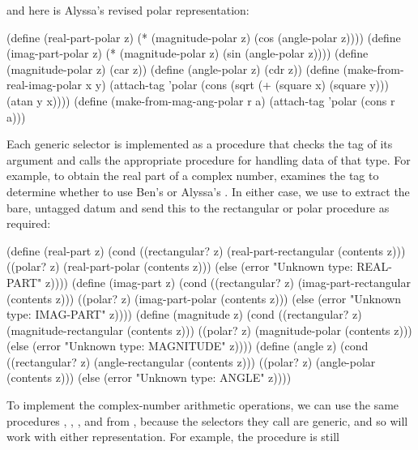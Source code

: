 \noindent
and here is Alyssa's revised polar representation:

\begin{codeBlock}
(define (real-part-polar z)
  (* (magnitude-polar z) (cos (angle-polar z))))
(define (imag-part-polar z)
  (* (magnitude-polar z) (sin (angle-polar z))))
(define (magnitude-polar z) (car z))
(define (angle-polar z) (cdr z))
(define (make-from-real-imag-polar x y)
  (attach-tag 'polar
              (cons (sqrt (+ (square x) (square y)))
                    (atan y x))))
(define (make-from-mag-ang-polar r a)
  (attach-tag 'polar (cons r a)))
\end{codeBlock}

\noindent
Each generic selector is implemented as a procedure that checks the tag of its
argument and calls the appropriate procedure for handling data of that type.
For example, to obtain the real part of a complex number, 
examines the tag to determine whether to use Ben's 
or Alyssa's .  In either case, we use  to
extract the bare, untagged datum and send this to the rectangular or polar
procedure as required:

\begin{codeBlock}
(define (real-part z)
  (cond ((rectangular? z)
         (real-part-rectangular (contents z)))
        ((polar? z)
         (real-part-polar (contents z)))
        (else (error "Unknown type: REAL-PART" z))))
(define (imag-part z)
  (cond ((rectangular? z)
         (imag-part-rectangular (contents z)))
        ((polar? z)
         (imag-part-polar (contents z)))
        (else (error "Unknown type: IMAG-PART" z))))
(define (magnitude z)
  (cond ((rectangular? z)
         (magnitude-rectangular (contents z)))
        ((polar? z)
         (magnitude-polar (contents z)))
        (else (error "Unknown type: MAGNITUDE" z))))
(define (angle z)
  (cond ((rectangular? z)
         (angle-rectangular (contents z)))
        ((polar? z)
         (angle-polar (contents z)))
        (else (error "Unknown type: ANGLE" z))))
\end{codeBlock}

\noindent
To implement the complex-number arithmetic operations, we can use the same
procedures , , , and
 from , because the selectors they call
are generic, and so will work with either representation.  For example, the
procedure  is still

